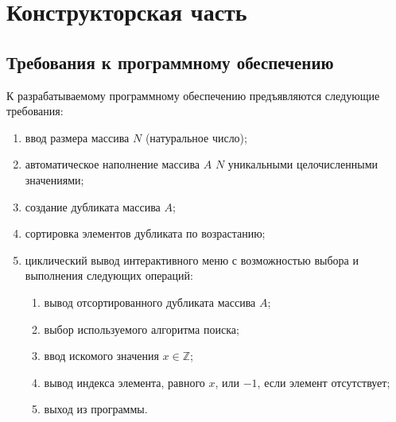 \chapter{Конструкторская часть}

\section{Требования к программному обеспечению}

К разрабатываемому программному обеспечению предъявляются следующие требования:

\begin{enumerate}[label=\asbuk*)]
	\item ввод размера массива $N$ (натуральное число);
	\item автоматическое наполнение массива $A$ $N$ уникальными целочисленными значениями;
	\item создание дубликата массива $A$;
	\item сортировка элементов дубликата по возрастанию;
	\item циклический вывод интерактивного меню с возможностью выбора и выполнения следующих операций:
	\begin{enumerate}[label=\arabic*)]
		\item вывод отсортированного дубликата массива $A$;
		\item выбор используемого алгоритма поиска;
		\item ввод искомого значения $x \in \mathbb{Z}$;
		\item вывод индекса элемента, равного $x$, или $-1$, если элемент отсутствует;
		\item выход из программы.
	\end{enumerate}
\end{enumerate}



